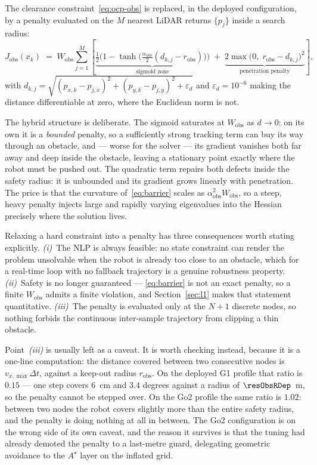 \documentclass[11pt,a4paper]{article}
\newcommand{\astar}{$A^\star$}
\newcommand{\Jobs}{J_{\mathrm{obs}}}
\newcommand{\Wobs}{W_{\mathrm{obs}}}
\newcommand{\aobs}{\alpha_{\mathrm{obs}}}
\newcommand{\robs}{r_{\mathrm{obs}}}
\begin{document}
The clearance constraint~\eqref{eq:ocp-obs} is replaced, in the deployed configuration, by a penalty
evaluated on the $M$ nearest LiDAR returns $\{p_j\}$ inside a search radius:
\begin{equation}
  \Jobs(x_k) \;=\; \Wobs\sum_{j=1}^{M}
  \left[\underbrace{\tfrac12\Big(1-\tanh\big(\tfrac{\aobs}{2}(d_{k,j}-\robs)\big)\Big)}_{\text{sigmoid zone}}
  \;+\;\underbrace{2\max\!\big(0,\;\robs-d_{k,j}\big)^2}_{\text{penetration penalty}}\right],
  \label{eq:barrier}
\end{equation}
with $d_{k,j}=\sqrt{(p_{x,k}-p_{j,x})^2+(p_{y,k}-p_{j,y})^2+\varepsilon_d}$ and $\varepsilon_d=10^{-6}$ making
the distance differentiable at zero, where the Euclidean norm is not.

The hybrid structure is deliberate. The sigmoid saturates at $\Wobs$ as $d\to0$: on its own it is a
\emph{bounded} penalty, so a sufficiently strong tracking term can buy its way through an obstacle, and ---
worse for the solver --- its gradient vanishes both far away and deep inside the obstacle, leaving a
stationary point exactly where the robot must be pushed out. The quadratic term repairs both defects inside
the safety radius: it is unbounded and its gradient grows linearly with penetration. The price is that the
curvature of~\eqref{eq:barrier} scales as $\aobs^2\Wobs$, so a steep, heavy penalty injects large and rapidly
varying eigenvalues into the Hessian precisely where the solution lives.

Relaxing a hard constraint into a penalty has three consequences worth stating explicitly.
\emph{(i)}~The NLP is always feasible: no state constraint can render the problem unsolvable when the robot
is already too close to an obstacle, which for a real-time loop with no fallback trajectory is a genuine
robustness property. \emph{(ii)}~Safety is no longer guaranteed --- \eqref{eq:barrier} is not an exact
penalty, so a finite $\Wobs$ admits a finite violation, and Section~\ref{sec:l1} makes that statement
quantitative. \emph{(iii)}~The penalty is evaluated only at the $N+1$ discrete nodes, so nothing forbids the
continuous inter-sample trajectory from clipping a thin obstacle.

Point~\emph{(iii)} is usually left as a caveat. It is worth checking instead, because it is a one-line
computation: the distance covered between two consecutive nodes is $v_{x,\max}\Delta t$, against a keep-out
radius $\robs$. On the deployed G1 profile that ratio is $0.15$ --- one step covers $6$~cm and $3.4$ degrees
against a radius of $\resObsRDep$~m, so the penalty cannot be stepped over. On the Go2 profile the same ratio
is $1.02$: between two nodes the robot covers slightly more than the entire safety radius, and the penalty is
doing nothing at all in between. The Go2 configuration is on the wrong side of its own caveat, and the reason
it survives is that the tuning had already demoted the penalty to a last-metre guard, delegating geometric
avoidance to the \astar{} layer on the inflated grid.
\end{document}
